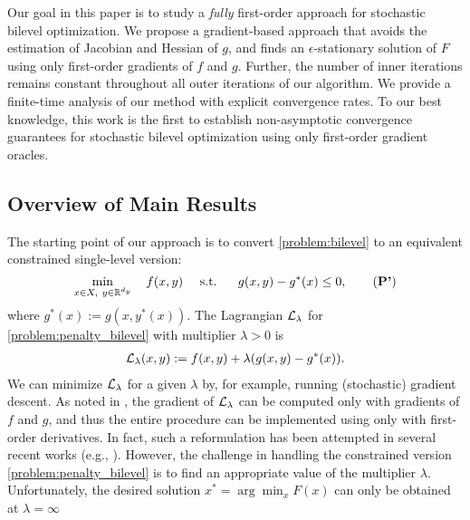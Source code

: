 Our goal in this paper is to study a {\it fully} first-order approach for stochastic bilevel optimization. 
We propose a gradient-based approach that avoids  the estimation of Jacobian and Hessian of $g$, and finds an $\epsilon$-stationary solution of $F$ using only first-order gradients of $f$ and $g$. 
Further,
the number of inner iterations  remains constant throughout all outer iterations of our algorithm. 
We provide a finite-time analysis of our method with explicit convergence rates. 
To our best knowledge, this work is the first to establish non-asymptotic convergence guarantees for stochastic bilevel optimization using only first-order gradient oracles.  


\subsection{Overview of Main Results}
The starting point of our approach is to convert \eqref{problem:bilevel} to an equivalent constrained single-level version:
\begin{equation}
    \min_{x \in X, \ y \in \mathbb{R}^{d_y}} \quad f(x,y) \ \quad \text{s.t.} \ \ \quad g(x,y) - g^*(x) \le 0, \label{problem:penalty_bilevel} \tag{\textbf{P'}}
\end{equation}
where $g^*(x) := g(x, y^*(x))$. 
The Lagrangian $\mathcal{L}_{\lambda}$ for \eqref{problem:penalty_bilevel} with multiplier $\lambda > 0$ is
\begin{align*}
    \mathcal{L}_\lambda(x,y) := f(x,y) + \lambda (g(x,y) - g^* (x)).
\end{align*}
We can minimize $\mathcal{L}_{\lambda}$ for a given $\lambda$ by, for example, running (stochastic) gradient descent. 
As noted in \cite{ye2022bome}, the gradient of $\mathcal{L}_{\lambda}$ can be computed only with gradients of $f$ and $g$, and thus the entire procedure can be implemented using only with first-order derivatives. 
In fact, such a reformulation has been attempted in several recent works (e.g., \cite{liu2021value, sow2022constrained, ye2022bome}). 
However, the challenge in handling the constrained version \eqref{problem:penalty_bilevel} is to find an appropriate value of the multiplier $\lambda$. 
Unfortunately, the desired solution $x^* = \arg\min_x F(x)$ can only be obtained at $\lambda = \infty$

